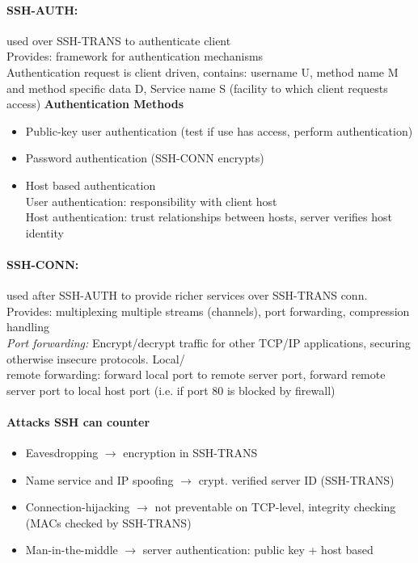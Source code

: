 \paragraph{SSH-AUTH:} used over SSH-TRANS to authenticate client \\
Provides: framework for authentication mechanisms\\
Authentication request is client driven, contains: username U, method name M and method specific data D, Service name S (facility to which client requests access)
\textbf{Authentication Methods}
\begin{itemize}
\item Public-key user authentication (test if use has access, perform authentication)
\item Password authentication (SSH-CONN encrypts) 
\item Host based authentication\\
\quad User authentication: responsibility with client host\\
\quad Host authentication: trust relationships between hosts, server verifies host identity
\end{itemize}

\paragraph{SSH-CONN:} used after SSH-AUTH to provide richer services over SSH-TRANS conn. Provides: multiplexing multiple streams (channels), port forwarding, compression handling\\
\emph{Port forwarding:} Encrypt/decrypt traffic for other TCP/IP applications, securing otherwise insecure protocols. Local/\\remote forwarding: forward local port to remote server port, forward remote server port to local host port (i.e. if port 80 is blocked by firewall)

\paragraph{Attacks SSH can counter}
\begin{itemize}
\item Eavesdropping $\to$ encryption in SSH-TRANS
\item Name service and IP spoofing $\to$ crypt. verified server ID (SSH-TRANS) 
\item Connection-hijacking $\to$ not preventable on TCP-level, integrity checking (MACs checked by SSH-TRANS)
\item Man-in-the-middle $\to$ server authentication: public key + host based
\end{itemize}

